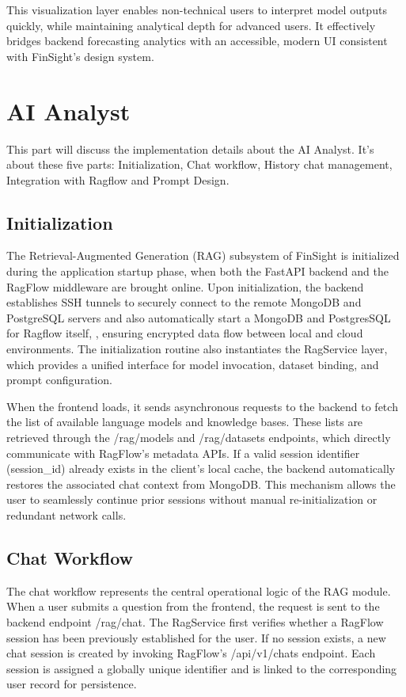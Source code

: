 This visualization layer enables non-technical users to interpret model outputs quickly, while maintaining analytical depth for advanced users. It effectively bridges backend forecasting analytics with an accessible, modern UI consistent with FinSight’s design system.


\section{AI Analyst}
This part will discuss the implementation details about the AI Analyst. It's about these five parts: Initialization, Chat workflow, History chat management, Integration with Ragflow and Prompt Design.

\subsection{Initialization}
The Retrieval-Augmented Generation (RAG) subsystem of FinSight is initialized during the application startup phase, when both the FastAPI backend and the RagFlow middleware are brought online. Upon initialization, the backend establishes SSH tunnels to securely connect to the remote MongoDB and PostgreSQL servers and also automatically start a MongoDB and PostgresSQL for Ragflow itself, , ensuring encrypted data flow between local and cloud environments. The initialization routine also instantiates the RagService layer, which provides a unified interface for model invocation, dataset binding, and prompt configuration.

When the frontend loads, it sends asynchronous requests to the backend to fetch the list of available language models and knowledge bases. These lists are retrieved through the /rag/models and /rag/datasets endpoints, which directly communicate with RagFlow’s metadata APIs. If a valid session identifier (session\_id) already exists in the client’s local cache, the backend automatically restores the associated chat context from MongoDB. This mechanism allows the user to seamlessly continue prior sessions without manual re-initialization or redundant network calls.

\subsection{Chat Workflow}
The chat workflow represents the central operational logic of the RAG module. When a user submits a question from the frontend, the request is sent to the backend endpoint /rag/chat. The RagService first verifies whether a RagFlow session has been previously established for the user. If no session exists, a new chat session is created by invoking RagFlow’s /api/v1/chats endpoint. Each session is assigned a globally unique identifier and is linked to the corresponding user record for persistence.

